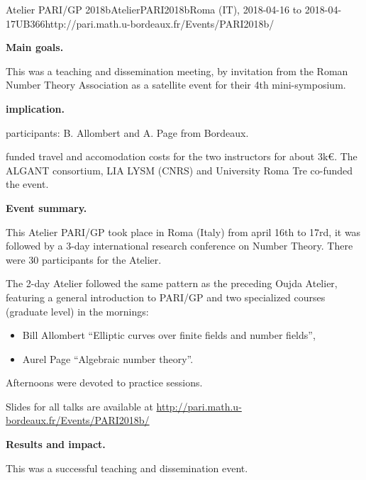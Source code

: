 \begin{event}{Atelier PARI/GP 2018b}{AtelierPARI2018b}{Roma (IT),
2018-04-16 to 2018-04-17}{UB}{36}{6}{http://pari.math.u-bordeaux.fr/Events/PARI2018b/}

\textbf{Main goals.}

This was a teaching and dissemination meeting, by invitation from the Roman
  Number Theory Association as a satellite event for their 4th
  mini-symposium.

\textbf{\ODK implication.}

\ODK participants: B. Allombert and A. Page from Bordeaux.

\ODK funded travel and accomodation costs for the two instructors for about
  3k\euro. The ALGANT consortium, LIA LYSM (CNRS) and University Roma Tre
  co-funded the event.

\textbf{Event summary.}

This Atelier PARI/GP took place in Roma (Italy) from april 16th to
17rd, it was followed by a 3-day international research conference on
  Number Theory. There were 30 participants for the Atelier.

The 2-day Atelier followed the same pattern as the preceding Oujda Atelier,
featuring a general introduction to PARI/GP and two
  specialized courses (graduate level) in the mornings:
\begin{itemize}
\item Bill Allombert ``Elliptic curves over finite fields and number fields'',
\item Aurel Page ``Algebraic number theory''.
\end{itemize}
Afternoons were devoted to practice sessions.

Slides for all talks are available at
\url{http://pari.math.u-bordeaux.fr/Events/PARI2018b/}

\textbf{Results and impact.}

This was a successful teaching and dissemination event.
\end{event}
